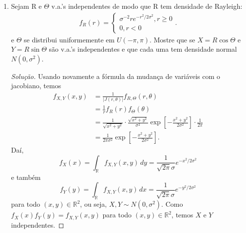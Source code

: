 \documentclass[../Notas.tex]{subfiles}
\begin{document}
\begin{enumerate}
\begin{proof}[Solução]
\begin{enumerate}
            \begin{align*}
                f_{X,Y}(x,y) &= \frac{1}{|J(u,z)|}
                f_{U,Z}\left(\frac{x-\mu_1}{\sigma_1}, \frac{x-\mu_2}{\sigma_2}\right) \\
                             &= \frac{1}{\sigma_1\sigma_2}\cdot\frac{1}{2\pi\sqrt{1-\rho^2}} \\
                             &\exp\left[ -\frac{1}{2(1-\rho^2)}
                             \left( \left(\frac{x-\mu_1}{\sigma_1}\right)^2 
                             - 2\rho\left(\frac{x-\mu_1}{\sigma_1}\right)
                             \left(\frac{y-\mu_2}{\sigma_2}\right) 
                             + \left(\frac{y-\mu_2}{\sigma_2}\right)^2 \right) \right],
            \end{align*}
            para todo $(x,y)\in\mathbb{R}^2$.
        \end{enumerate}
    \end{proof}
    \item Sejam R e $\Theta$ v.a.’s independentes de modo que R tem densidade de Rayleigh:
    \begin{align*}
        f_R(r) = \begin{cases}
            \sigma^{-2}re^{-r^2/2\sigma^2}, r\geq 0 \\
            0, r < 0
        \end{cases}.
    \end{align*}
    e $\Theta$ se distribui uniformemente em $U(-\pi, \pi)$. Mostre que se $X = R\cos\Theta$ e $Y = R\sin\Theta$ são v.a.’s independentes e que cada uma tem densidade normal $N(0, \sigma^2)$.
    \begin{proof}[Solução]
        Usando novamente a fórmula da mudança de variáveis com o jacobiano, temos
        \begin{align*}
            f_{X,Y}(x,y) &= \frac{1}{|J(r,\theta)|}f_{R, \Theta}(r, \theta) \\
                         &= \frac{1}{r}f_R(r)f_{\Theta}(\theta) \\
                         &= \frac{1}{\sqrt{x^2+y^2}}\cdot\frac{\sqrt{x^2+y^2}}{\sigma^2}
                         \exp\left[-\frac{x^2+y^2}{2\sigma^2}\right]\cdot\frac{1}{2\pi} \\
                         &= \frac{1}{2\pi\sigma^2}\exp\left[-\frac{x^2+y^2}{2\sigma^2}\right].
        \end{align*}
        Daí,
        \[
        f_X(x) = \int_{\mathbb{R}} f_{X,Y}(x,y) \, dy = \frac{1}{\sqrt{2\pi}\sigma}e^{-x^2/2\sigma^2}
        \]
        e também
        \[
        f_Y(y) = \int_{\mathbb{R}} f_{X,Y}(x,y) \, dx = \frac{1}{\sqrt{2\pi}\sigma}e^{-y^2/2\sigma^2}
        \]
        para todo $(x,y)\in\mathbb{R}^2$, ou seja, $X,Y\sim N(0, \sigma^2)$.
        Como $f_X(x)f_Y(y) = f_{X,Y}(x,y)$ para todo $(x,y)\in\mathbb{R}^2$, temos $X$ e $Y$
        independentes.
    \end{proof}
\end{enumerate}
\end{document}
